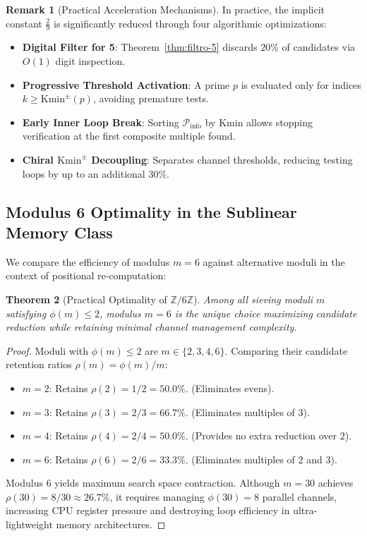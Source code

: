 \documentclass{article}
\numberwithin{equation}{section}
\theoremstyle{plain}
\newtheorem{theorem}{Theorem}[section]
\theoremstyle{definition}
\newtheorem{remark}[theorem]{Remark}
\begin{document}
\begin{remark}[Practical Acceleration Mechanisms]
In practice, the implicit constant $\frac{2}{9}$ is significantly reduced through four algorithmic optimizations:
\begin{itemize}
    \item \textbf{Digital Filter for 5}: Theorem~\ref{thm:filtro-5} discards $20\%$ of candidates via $O(1)$ digit inspection.
    \item \textbf{Progressive Threshold Activation}: A prime $p$ is evaluated only for indices $k \ge \mathrm{Kmin}^\pm(p)$, avoiding premature tests.
    \item \textbf{Early Inner Loop Break}: Sorting $\mathcal{P}_{\text{info}}$ by $\mathrm{Kmin}$ allows stopping verification at the first composite multiple found.
    \item \textbf{Chiral $\mathrm{Kmin}^\pm$ Decoupling}: Separates channel thresholds, reducing testing loops by up to an additional $30\%$.
\end{itemize}
\end{remark}

\subsection{Modulus 6 Optimality in the Sublinear Memory Class}

We compare the efficiency of modulus $m=6$ against alternative moduli in the context of positional re-computation:

\begin{theorem}[Practical Optimality of $\mathbb{Z}/6\mathbb{Z}$]
\label{thm:optimalidad-practica}
Among all sieving moduli $m$ satisfying $\phi(m) \le 2$, modulus $m = 6$ is the unique choice maximizing candidate reduction while retaining minimal channel management complexity.
\end{theorem}

\begin{proof}
Moduli with $\phi(m) \le 2$ are $m \in \{2, 3, 4, 6\}$. Comparing their candidate retention ratios $\rho(m) = \phi(m)/m$:
\begin{itemize}
    \item $m = 2$: Retains $\rho(2) = 1/2 = 50.0\%$. (Eliminates evens).
    \item $m = 3$: Retains $\rho(3) = 2/3 = 66.7\%$. (Eliminates multiples of $3$).
    \item $m = 4$: Retains $\rho(4) = 2/4 = 50.0\%$. (Provides no extra reduction over $2$).
    \item $m = 6$: Retains $\rho(6) = 2/6 = 33.3\%$. (Eliminates multiples of $2$ and $3$).
\end{itemize}
Modulus $6$ yields maximum search space contraction. Although $m = 30$ achieves $\rho(30) = 8/30 \approx 26.7\%$, it requires managing $\phi(30) = 8$ parallel channels, increasing CPU register pressure and destroying loop efficiency in ultra-lightweight memory architectures.
\end{proof}
\end{document}
